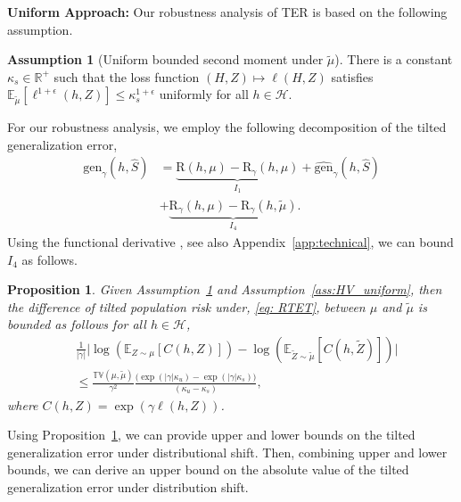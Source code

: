 \documentclass{article}
\theoremstyle{plain}
\theoremstyle{plain}
\newtheorem{proposition}[theorem]{Proposition}
\theoremstyle{definition}
\newtheorem{assumption}[theorem]{Assumption}
\theoremstyle{remark}
\newcommand{\RTrue}{\mathrm{R}}
\newcommand{\RTET}{\mathrm{R}_{\gamma}}
\newcommand{\mbE}{\mathbb{E}}
\newcommand{\nn}{\nonumber}
\newcommand{\todoa}[2][]{\todo[size=tiny,color=blue!20!white,#1]{GA: #2}\xspace}
\newcommand{\todor}[2][]{\todo[size=tiny,color=orange!20!white,#1]{GR: #2}\xspace}
\begin{document}
\textbf{Uniform Approach:} Our robustness analysis of TER is based on the following assumption.
\begin{assumption}[Uniform bounded second moment under $\tilde{\mu}$]\label{ass: bounded sec moment uniform robust}
    There is a constant $\kappa_s\in\mathbb{R}^+$ such that the loss function $(H,Z)\mapsto\ell(H,Z)$ satisfies $\mbE_{ \tilde{\mu}}[\ell^{1+\epsilon}(h,Z)]\leq \kappa_s^{1+\epsilon}$ uniformly for all $h \in \mathcal{H}$.
\end{assumption}
 For our robustness analysis, we 
employ the following decomposition of the tilted generalization error,
\begin{equation}\label{eq_gen_decom_robust}
    \begin{split}
\mathrm{gen}_{\gamma}(h,\hat S)&=   \underbrace{\RTrue(h,\mu)- \RTET(h,\mu)}_{I_1}+\widehat{\mathrm{gen}}_{\gamma}(h,\hat{S})\\&
+  \underbrace{\RTET(h,\mu)-\RTET(h,\tilde{\mu})}_{I_4}.
    \end{split}
\end{equation}
Using the functional derivative \citep{cardaliaguet2019master}, see also Appendix~\ref{app:technical}, we can bound $I_4$ as follows.
\begin{proposition}\label{prop: noise robust}
    Given Assumption~\ref{ass: bounded sec moment uniform robust} and Assumption~\ref{ass:HV_uniform}, then the difference of tilted population risk under, \eqref{eq: RTET}, between $\mu$ and $\tilde{\mu}$ is bounded as follows for all $h\in\mathcal{H}$,
    \begin{align}
        &\frac{1}{|\gamma|}\Big|\log(\mbE_{ Z\sim\mu}[C(h, Z)])-\log(\mbE_{\tilde Z\sim\tilde{\mu}}[C(h,\tilde Z)])\Big|
        \\\nn&\leq \frac{\mathbb{TV}(\mu,\tilde{\mu})}{\gamma^2 }\frac{\Big(\exp(|\gamma|\kappa_u)-\exp(|\gamma|\kappa_s)\Big)}{(\kappa_u-\kappa_s)},
        \end{align}
        where $C(h, Z)=\exp(\gamma\ell(h, Z))$.
\end{proposition}
Using Proposition~\ref{prop: noise robust}, we can provide upper and lower bounds on the tilted generalization error under distributional shift. Then, combining upper and lower bounds, we can derive an upper bound on the absolute value of the tilted generalization error under distribution shift.
\end{document}
